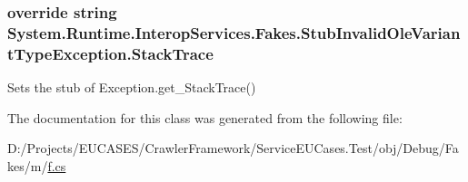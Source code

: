 \hypertarget{class_system_1_1_runtime_1_1_interop_services_1_1_fakes_1_1_stub_invalid_ole_variant_type_exception_ae39167b1b327867da4ab2be730fa4d02}{
\subsubsection[{Stack\-Trace}]{\setlength{\rightskip}{0pt plus 5cm}override string System.\-Runtime.\-Interop\-Services.\-Fakes.\-Stub\-Invalid\-Ole\-Variant\-Type\-Exception.\-Stack\-Trace\hspace{0.3cm}{\ttfamily [get]}}}\label{class_system_1_1_runtime_1_1_interop_services_1_1_fakes_1_1_stub_invalid_ole_variant_type_exception_ae39167b1b327867da4ab2be730fa4d02}


Sets the stub of Exception.\-get\-\_\-\-Stack\-Trace()



The documentation for this class was generated from the following file\-:\begin{DoxyCompactItemize}
\item 
D\-:/\-Projects/\-E\-U\-C\-A\-S\-E\-S/\-Crawler\-Framework/\-Service\-E\-U\-Cases.\-Test/obj/\-Debug/\-Fakes/m/\hyperlink{m_2f_8cs}{f.\-cs}\end{DoxyCompactItemize}
